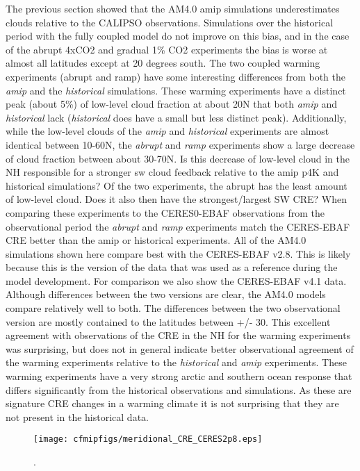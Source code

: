 \documentclass[11pt]{article}   	%
\begin{document}
The previous section showed that the AM4.0 amip simulations underestimates clouds relative to the CALIPSO observations.  
Simulations over the historical period with the fully coupled model do not improve on this bias, and in the case of the abrupt
4xCO2 and gradual 1\% CO2 experiments the bias is worse at almost all latitudes except at 20 degrees south.  The two coupled
warming experiments (abrupt and ramp) have some interesting differences from both the \textit{amip} and the
 \textit{historical} simulations.   These warming experiments have a distinct peak (about 5\%) of low-level cloud fraction at about 20N that 
 both \textit{amip} and \textit{historical} lack (\textit{historical} does have a small but less distinct peak).  Additionally, 
 while the low-level clouds of the \textit{amip} and \textit{historical} experiments are almost identical between 10-60N, the 
 \textit{abrupt} and \textit{ramp} experiments show a large decrease of cloud fraction between about 30-70N.  Is this decrease
 of low-level cloud in the NH responsible for a stronger sw cloud feedback relative to the amip p4K and historical simulations?  Of the 
 two experiments, the abrupt has the least amount of low-level cloud.  Does it also then have the strongest/largest SW CRE?  
 When comparing these experiments to the CERES0-EBAF observations from the observational period the \textit{abrupt} and 
 \textit{ramp} experiments match the CERES-EBAF CRE better than the amip or historical experiments.  All of the AM4.0 
 simulations shown here compare best with the CERES-EBAF v2.8.  This is likely because this is the version of the data that 
 was used as a reference during the model development.  For comparison we also show the CERES-EBAF v4.1 data.  Although 
 differences between the two versions are clear, the AM4.0 models compare relatively well to both.  The differences between 
 the two observational version are mostly contained to the latitudes between +/- 30.  This excellent agreement with observations 
 of the CRE in the NH for the warming experiments was surprising, but does not in general indicate better observational 
 agreement of the warming experiments relative to the \textit{historical} and \textit{amip} experiments.   These warming 
 experiments have a very strong arctic and southern ocean response that differs significantly from the historical observations 
 and simulations.   As these are signature CRE changes in a warming climate it is not surprising that they are not 
 present in the historical data.  

\begin{figure}
  \texttt{[image: cfmipfigs/meridional\_CRE\_CERES2p8.eps]}
  \caption{.}
  \label{fig:CRE_multiexperiments_ceres}
\end{figure}
\end{document}
